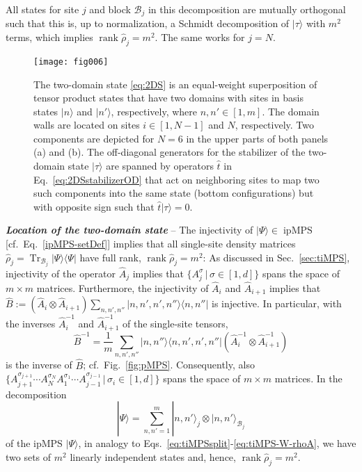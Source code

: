 \documentclass[english,11pt,aps,pra,onecolumn,tightenlines,groupedaddress,superscriptaddress,notitlepage,floatfix,fleqn]{revtex4-1}
\newcommand{\bra}{\langle}
\newcommand{\ket}{\rangle}
\newcommand{\Tr}{\operatorname{Tr}}
\newcommand{\Rank}{\operatorname{rank}}
\newcommand{\hA}{\hat{A}}
\newcommand{\hB}{\hat{B}}
\newcommand{\hT}{\hat{t}}
\newcommand{\dm}{{\hat{\rho}}}
\newcommand{\s}{\sigma}
\newcommand{\mc}[1]{\mathcal{#1}}
\newcommand{\B}{\mc{B}}
\newcommand{\ipMPS}{\operatorname{ipMPS}}
\newcommand{\Emph}[1]{\textbf{\emph{#1}}}
\begin{document}
All states for site $j$ and block $\B_j$ in this decomposition are mutually orthogonal such that this is, up to normalization, a Schmidt decomposition of $|\tau\ket$ with $m^2$ terms, which implies $\Rank\dm_j=m^2$. The same works for $j=N$.
\begin{figure*}[t]
\label{fig:2DSstabilizer}
\texttt{[image: fig006]}
\caption{The two-domain state \eqref{eq:2DS} is an equal-weight superposition of tensor product states that have two domains with sites in basis states $|n\ket$ and $|n'\ket$, respectively, where $n,n'\in [1,m]$. The domain walls are located on sites $i\in[1,N-1]$ and $N$, respectively. Two components are depicted for $N=6$ in the upper parts of both panels (a) and (b). The off-diagonal generators for the stabilizer of the two-domain state $|\tau\ket$ are spanned by operators $\hT$ in Eq.~\eqref{eq:2DSstabilizerOD} that act on neighboring sites to map two such components into the same state (bottom configurations) but with opposite sign such that $\hT|\tau\ket=0$.}
\end{figure*}

\Emph{Location of the two-domain state} -- 
The injectivity of $|\Psi\ket\in\ipMPS$ [cf.~Eq.~\eqref{ipMPS-setDef}] implies that all single-site density matrices $\dm_j=\Tr_{\B_j}|\Psi\ket\bra\Psi|$ have full rank, $\Rank\dm_j=m^2$: As discussed in Sec.~\ref{sec:tiMPS}, injectivity of the operator $\hA_j$ implies that $\{A^\s_j\,|\,\s\in[1,d]\}$ spans the space of $m\times m$ matrices. Furthermore, the injectivity of $\hA_i$ and $\hA_{i+1}$ implies that $\hB:=(\hA_i\otimes \hA_{i+1})\sum_{n,n',n''}|n,n',n',n''\ket\bra n,n''|$ is injective. In particular, with the inverses $\hA^{-1}_i$ and $\hA^{-1}_{i+1}$ of the single-site tensors, 
\begin{equation}\label{eq:ipMPS-inverse}
 	\hB^{-1}=\frac{1}{m}\sum_{n,n',n''}| n,n''\ket\bra n,n',n',n''|(\hA^{-1}_i\otimes \hA^{-1}_{i+1})
\end{equation}
is the inverse of $\hB$; cf.\ Fig.~\ref{fig:pMPS}. Consequently, also $\{A^{\s_{j+1}}_{j+1}\dotsb A^{\s_{N}}_{N}A^{\s_{1}}_{1}\dotsb A^{\s_{j-1}}_{j-1}\,|\,\s_i\in[1,d]\}$ spans the space of $m\times m$ matrices. In the decomposition
\begin{equation}
	|\Psi\ket=\sum_{n,n'=1}^m|n,n'\ket_j\otimes |n,n'\ket_{\B_j}
\end{equation}
of the ipMPS $|\Psi\ket$, in analogy to Eqs.~\eqref{eq:tiMPSsplit}-\eqref{eq:tiMPS-W-rhoA}, we have two sets of $m^2$ linearly independent states and, hence, $\Rank \dm_j=m^2$.
\end{document}
